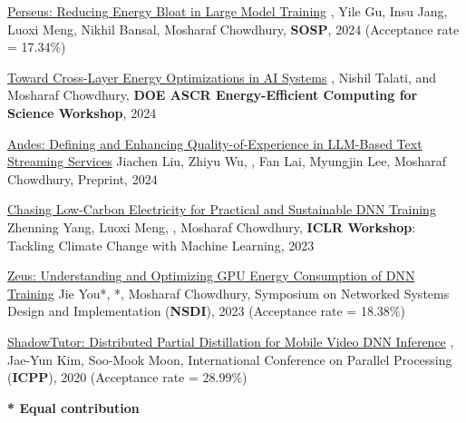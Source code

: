 

\begin{cvlist}

  \cvlistitem
    {\href{https://arxiv.org/abs/2312.06902}{Perseus: Reducing Energy Bloat in Large Model Training}} %
    {, Yile Gu, Insu Jang, Luoxi Meng, Nikhil Bansal, Mosharaf Chowdhury, \textbf{SOSP}, 2024 (Acceptance rate = 17.34\%)} %

  \cvlistitem
    {\href{https://arxiv.org/abs/2404.06675}{Toward Cross-Layer Energy Optimizations in AI Systems}} %
    {, Nishil Talati, and Mosharaf Chowdhury, \textbf{DOE ASCR Energy-Efficient Computing for Science Workshop}, 2024} %

  \cvlistitem
    {\href{https://arxiv.org/abs/2404.16283}{Andes: Defining and Enhancing Quality-of-Experience in LLM-Based Text Streaming Services}} %
    {Jiachen Liu, Zhiyu Wu, , Fan Lai, Myungjin Lee, Mosharaf Chowdhury, Preprint, 2024} %

  \cvlistitem
    {\href{https://www.climatechange.ai/papers/iclr2023/29}{Chasing Low-Carbon Electricity for Practical and Sustainable DNN Training}} %
    {Zhenning Yang, Luoxi Meng, , Mosharaf Chowdhury, \textbf{ICLR Workshop}: Tackling Climate Change with Machine Learning, 2023} %

  \cvlistitem
    {\href{https://www.usenix.org/conference/nsdi23/presentation/you}{Zeus: Understanding and Optimizing GPU Energy Consumption of DNN Training}} %
    {Jie You*, *, Mosharaf Chowdhury, Symposium on Networked Systems Design and Implementation (\textbf{NSDI}), 2023 (Acceptance rate = 18.38\%)} %

  \cvlistitem
    {\href{https://dl.acm.org/doi/10.1145/3404397.3404404}{ShadowTutor: Distributed Partial Distillation for Mobile Video DNN Inference}} %
    {, Jae-Yun Kim, Soo-Mook Moon, International Conference on Parallel Processing (\textbf{ICPP}), 2020 (Acceptance rate = 28.99\%)} %

\end{cvlist}

\vspace{-5mm}
\begin{cvparagraph}
  \textbf{* Equal contribution}
\end{cvparagraph}
